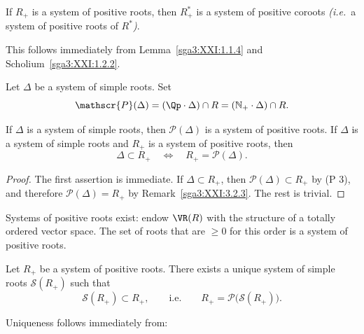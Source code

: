 \begin{remark}\label{sga3:XXI:3.2.4}
If \(R_+\) is a system of positive roots, then \(R^\ast_+\) is a
system of positive coroots \emph{(i.e.}\ a system of positive roots
of \(R^\ast\)\emph{)}.
\end{remark}

This follows immediately from Lemma~\ref{sga3:XXI:1.1.4} and
Scholium~\ref{sga3:XXI:1.2.2}.

\begin{definition}\label{sga3:XXI:3.2.5}
Let \(\Delta\) be a system of simple roots. Set
\[
 \mathscr{P}(\Delta)
 =(\Qp\cdot\Delta)\cap R
 =(\mathbb N_+\cdot\Delta)\cap R.
\]
\end{definition}


\begin{proposition}\label{sga3:XXI:3.2.6}
If \(\Delta\) is a system of simple roots, then
\(\mathscr{P}(\Delta)\) is a system of positive roots. If \(\Delta\)
is a system of simple roots and \(R_+\) is a system of positive roots,
then
\[
 \Delta\subset R_+
 \quad\Longleftrightarrow\quad
 R_+=\mathscr{P}(\Delta).
\]
\end{proposition}

\begin{proof}
The first assertion is immediate. If \(\Delta\subset R_+\), then
\(\mathscr{P}(\Delta)\subset R_+\) by (P 3), and therefore
\(\mathscr{P}(\Delta)=R_+\) by
Remark~\ref{sga3:XXI:3.2.3}. The rest is trivial.
\end{proof}

\begin{remark}\label{sga3:XXI:3.2.7}
Systems of positive roots exist: endow \(\VR(R)\) with the structure
of a totally ordered vector space. The set of roots that are
\(\geq0\) for this order is a system of positive roots.
\end{remark}

\begin{theorem}\label{sga3:XXI:3.2.8}
Let \(R_+\) be a system of positive roots. There exists a unique
system of simple roots \(\mathscr{S}(R_+)\) such that
\[
 \mathscr{S}(R_+)\subset R_+,
 \qquad\text{i.e.}\qquad
 R_+=\mathscr{P}\bigl(\mathscr{S}(R_+)\bigr).
\]
\end{theorem}

Uniqueness follows immediately from:

